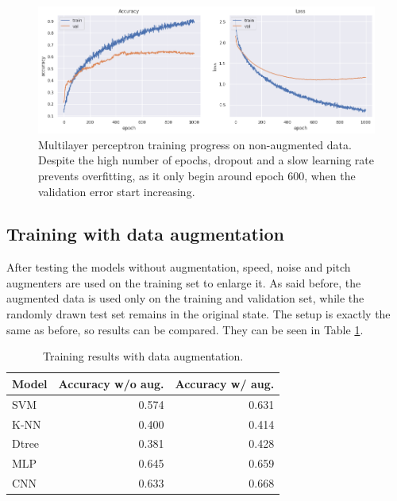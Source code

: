 \begin{figure}
    \begin{center}
      \includegraphics[width=\textwidth]{images/mlp1.png}
      \caption{Multilayer perceptron training progress on non-augmented data. Despite the 
      high number of epochs, dropout and a slow 
      learning rate prevents overfitting, as it only begin around epoch 600, 
      when the validation error start increasing.} \label{fig:mlp1}
    \end{center}
\end{figure}

\subsection{Training with data augmentation}

After testing the models without augmentation, speed, noise and pitch augmenters 
are used on the training set to enlarge it. 
As said before, the augmented data is used only on the training and validation set, 
while the randomly drawn test set remains in the original state.
The setup is exactly the same as before, so results can be compared. 
They can be seen in Table \ref{tab:res2}.

\begin{table}[H]
    \begin{center}
        \begin{tabular}{ |l|r|r| } 
        \hline
        Model & Accuracy w/o aug. & Accuracy w/ aug. \\
        \hline
        SVM   & 0.574  &  0.631 \\
        K-NN   & 0.400  &  0.414 \\
        Dtree & 0.381  &  0.428 \\
        MLP   & 0.645  &  0.659 \\
        CNN   & 0.633  &  0.668 \\
        \hline
        \end{tabular}
    \end{center}
    \caption{Training results with data augmentation.} \label{tab:res2}
\end{table}

